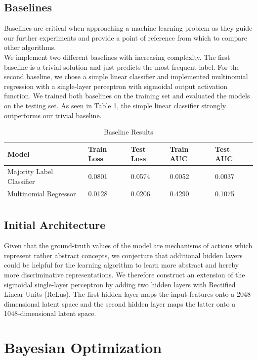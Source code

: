 \documentclass[bsc,frontabs,twoside,singlespacing,parskip,deptreport]{infthesis}     %
\begin{document}
\subsection{Baselines}
Baselines are critical when approaching a machine learning problem as they guide our further experiments and provide a point of reference from which to compare other algorithms.\\
We implement two different baselines with increasing complexity. The first baseline is a trivial solution and just predicts the most frequent label.
For the second baseline, we chose a simple linear classifier and implemented multinomial regression with a single-layer perceptron with sigmoidal output activation function.
We trained both baselines on the training set and evaluated the models on the testing set. As seen in Table \ref{baseline table}, the simple linear classifier strongly outperforms our trivial baseline.
\begin{table}
\centering
\begin{tabular}{lllll}
\toprule
{Model} &  Train Loss &  Test Loss & Train AUC & Test AUC  \\
\midrule
Majority Label Classifier &  0.0801 & 0.0574 & 0.0052 & 0.0037  \\
Multinomial Regressor  & 0.0128 & 0.0206 & 0.4290 & 0.1075 \\
\bottomrule
\caption{Baseline Results}\label{baseline table}
\end{tabular}

\end{table}
\subsection{Initial Architecture}
Given that the ground-truth values of the model are mechanisms of actions which represent rather abstract concepts, we conjecture that additional hidden layers could be helpful for the learning algorithm to learn more abstract and hereby more discriminative representations. 
We therefore construct an extension of the sigmoidal single-layer perceptron by adding two hidden layers with Rectified Linear Units (ReLus). The first hidden layer maps the input features onto a 2048-dimensional latent space and the second hidden layer maps the latter onto a 1048-dimensional latent space.

\section{Bayesian Optimization}\label{moaprediction}
\end{document}
